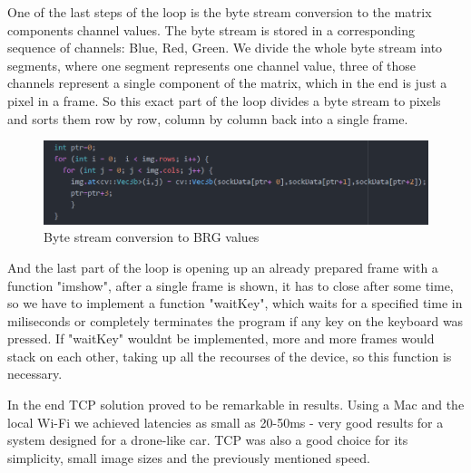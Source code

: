 \documentclass[conference]{IEEEtran}
\begin{document}
\newline
One of the last steps of the loop is the byte stream conversion to the matrix components channel values. The byte stream is stored in a corresponding sequence of channels: Blue, Red, Green. We divide the whole byte stream into segments, where one segment represents one channel value, three of those channels represent a single component of the matrix, which in the end is just a pixel in a frame. So this exact part of the loop divides a byte stream to pixels and sorts them row by row, column by column back into a single frame.
\begin{figure}[h!]
	\includegraphics[width=\linewidth]{ServerCodeExample3.png}
	\caption{Byte stream conversion to BRG values}
	\label{fig:SCE3}
\end{figure}
\newline
And the last part of the loop is opening up an already prepared frame with a function "imshow", after a single frame is shown, it has to close after some time, so we have to implement a function "waitKey", which waits for a specified time in miliseconds or completely terminates the program if any key on the keyboard was pressed. If "waitKey" wouldnt be implemented, more and more frames would stack on each other, taking up all the recourses of the device, so this function is necessary.

In the end TCP solution proved to be remarkable in results. Using a Mac and the local Wi-Fi we achieved latencies as small as 20-50ms - very good results for a system designed for a drone-like car. TCP was also a good choice for its simplicity, small image sizes and the previously mentioned speed.
\end{document}
